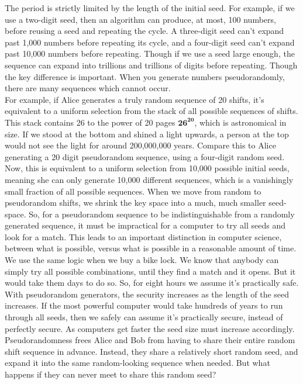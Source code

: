 \documentclass{report}
\begin{document}
 The period is strictly limited by the length of the initial seed. For example, if we use a two-digit seed, then an algorithm can produce, at most, 100 numbers, before reusing a seed and repeating the cycle. A three-digit seed can't expand past 1,000 numbers before repeating its cycle, and a four-digit seed can't expand past 10,000 numbers before repeating. Though if we use a seed large enough, the sequence can expand into trillions and trillions of digits before repeating. Though the key difference is important. When you generate numbers pseudorandomly, there are many sequences which cannot occur.\\
For example, if Alice generates a truly random sequence of 20 shifts, it's equivalent to a uniform selection from the stack of all possible sequences of shifts. This stack contains 26 to the power of 20 pages $\mathbf{26^{20}}$, which is astronomical in size. If we stood at the bottom and shined a light upwards, a person at the top would not see the light for around 200,000,000 years. Compare this to Alice generating a 20 digit pseudorandom sequence, using a four-digit random seed. Now, this is equivalent to a uniform selection from 10,000 possible initial seeds, meaning she can only generate 10,000 different sequences, which is a vanishingly small fraction of all possible sequences. When we move from random to pseudorandom shifts, we shrink the key space into a much, much smaller seed-space. So, for a pseudorandom sequence to be indistinguishable from a randomly generated sequence, it must be impractical for a computer to try all seeds and look for a match. This leads to an important distinction in computer science, between what is possible, versus what is possible in a reasonable amount of time. We use the same logic when we buy a bike lock. We know that anybody can simply try all possible combinations, until they find a match and it opens. But it would take them days to do so. So, for eight hours we assume it's practically safe.\\
With pseudorandom generators, the security increases as the length of the seed increases. If the most powerful computer would take hundreds of years to run through all seeds, then we safely can assume it's practically secure, instead of perfectly secure. As computers get faster the seed size must increase accordingly. Pseudorandomness frees Alice and Bob from having to share their entire random shift sequence in advance. Instead, they share a relatively short random seed, and expand it into the same random-looking sequence when needed. But what happens if they can never meet to share this random seed?
\newpage
\end{document}
